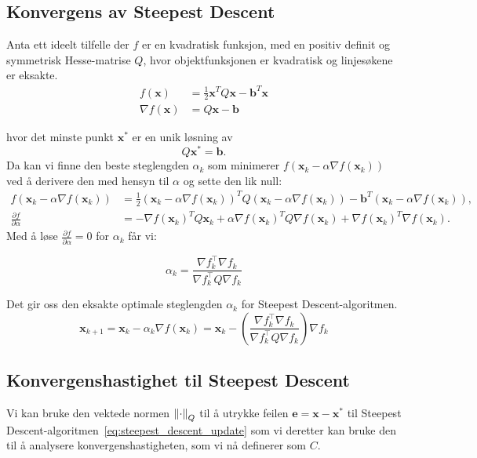 \subsection{Konvergens av Steepest Descent}
Anta ett ideelt tilfelle der \(f\) er en kvadratisk funksjon, med en positiv definit og symmetrisk Hesse-matrise \(Q\), hvor objektfunksjonen er kvadratisk og linjesøkene er eksakte.
\begin{align*}
	f(\symbf{x})        & = \frac{1}{2} \symbf{x}^T Q \symbf{x} - \symbf{b}^T \symbf{x} \\
	\nabla f(\symbf{x}) & = Q \symbf{x} - \symbf{b}
\end{align*}\label{eq:quadratic_function}

hvor det minste punkt \(\symbf{x}^\ast\) er en unik løsning av
\[
	Q \symbf{x}^\ast = \symbf{b}.
\]
Da kan vi finne den beste steglengden \(\alpha_k\) som minimerer \(f(\symbf{x}_k - \alpha \nabla f(\symbf{x}_k))\) ved å derivere den med hensyn til \(\alpha\) og sette den lik null:
\begin{align*}
	f(\symbf{x}_k - \alpha \nabla f(\symbf{x}_k)) & = \frac{1}{2} (\symbf{x}_k - \alpha \nabla f(\symbf{x}_k))^T Q (\symbf{x}_k - \alpha \nabla f(\symbf{x}_k)) - \symbf{b}^T (\symbf{x}_k - \alpha \nabla f(\symbf{x}_k)), \\
	\frac{\partial f}{\partial \alpha}            & = -\nabla f(\symbf{x}_k)^T Q \symbf{x}_k + \alpha \nabla f(\symbf{x}_k)^T Q \nabla f(\symbf{x}_k) + \nabla f(\symbf{x}_k)^T \nabla f(\symbf{x}_k).
\end{align*}
Med å løse \(\frac{\partial f}{\partial \alpha} = 0\) for \(\alpha_k\) får vi:

\[
	\alpha_k = \frac{\nabla f_k^\top \nabla f_k}{\nabla f_k^\top Q \nabla f_k}
\]

Det gir oss den eksakte optimale steglengden \(\alpha_k\) for Steepest Descent-algoritmen.
\begin{equation*}
	\symbf{x}_{k+1} = \symbf{x}_k - \alpha_k \nabla f(\symbf{x}_k) = \symbf{x}_k - \left(\frac{\nabla f_k^\top \nabla f_k}{\nabla f_k^\top Q \nabla f_k}\right) \nabla f_k
\end{equation*}\label{eq:steepest_descent_update}


\subsection{Konvergenshastighet til Steepest Descent}
Vi kan bruke den vektede normen $\norm*{\cdot}_Q$ til å utrykke feilen $\symbf{e} = \symbf{x} - \symbf{x}^\ast$ til Steepest Descent-algoritmen~\eqref{eq:steepest_descent_update} som vi deretter kan bruke den til å analysere konvergenshastigheten, som vi nå definerer som \(C\).

